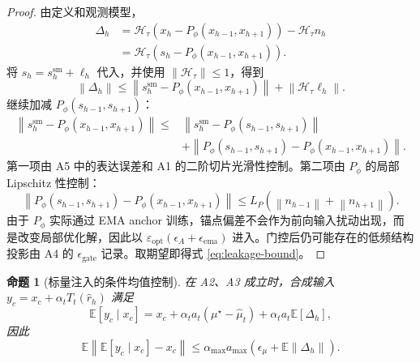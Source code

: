 \documentclass[11pt,a4paper,UTF8,fontset=fandol]{ctexart}
\newtheorem{proposition}[theorem]{命题}
\theoremstyle{definition}
\newcommand{\norm}[1]{\left\lVert#1\right\rVert}
\newcommand{\E}{\mathbb{E}}
\newcommand{\cH}{\mathcal{H}}
\begin{document}
\begin{proof}
由定义和观测模型，
\begin{equation}
\begin{aligned}
    \Delta_h
    &=\cH_\tau(x_h-P_\phi(x_{h-1},x_{h+1}))-\cH_\tau n_h\\
    &=\cH_\tau(s_h-P_\phi(x_{h-1},x_{h+1})).
\end{aligned}
\end{equation}
将 $s_h=s_h^{\mathrm{sm}}+\ell_h$ 代入，并使用 $\norm{\cH_\tau}\le1$，得到
\begin{equation}
    \norm{\Delta_h}
    \le
    \norm{s_h^{\mathrm{sm}}-P_\phi(x_{h-1},x_{h+1})}
    +\norm{\cH_\tau\ell_h}.
\end{equation}
继续加减 $P_\phi(s_{h-1},s_{h+1})$：
\begin{equation}
\begin{aligned}
    \norm{s_h^{\mathrm{sm}}-P_\phi(x_{h-1},x_{h+1})}
    \le&
    \norm{s_h^{\mathrm{sm}}-P_\phi(s_{h-1},s_{h+1})}\\
    &+\norm{P_\phi(s_{h-1},s_{h+1})
    -P_\phi(x_{h-1},x_{h+1})}.
\end{aligned}
\end{equation}
第一项由 A5 中的表达误差和 A1 的二阶切片光滑性控制。第二项由 $P_\phi$ 的局部 Lipschitz 性控制：
\begin{equation}
    \norm{P_\phi(s_{h-1},s_{h+1})
    -P_\phi(x_{h-1},x_{h+1})}
    \le L_P(\norm{n_{h-1}}+\norm{n_{h+1}}).
\end{equation}
由于 $P_\phi$ 实际通过 EMA anchor 训练，锚点偏差不会作为前向输入扰动出现，而是改变局部优化解，因此以 $\varepsilon_{\mathrm{opt}}(\epsilon_A+\epsilon_{\mathrm{ema}})$ 进入。门控后仍可能存在的低频结构投影由 A4 的 $\epsilon_{\mathrm{gate}}$ 记录。取期望即得式 \eqref{eq:leakage-bound}。
\end{proof}

\begin{proposition}[标量注入的条件均值控制]
\label{prop:conditional-mean}
在 A2、A3 成立时，合成输入 $y_c=x_c+\alpha_tT_t(\hat r_h)$ 满足
\begin{equation}
\label{eq:conditional-mean}
    \E[y_c\mid x_c]
    =
    x_c+\alpha_t a_t(\mu^\star-\hat\mu_t)
    +\alpha_t a_t\E[\Delta_h],
\end{equation}
因此
\begin{equation}
\label{eq:conditional-mean-bound}
    \E\norm{\E[y_c\mid x_c]-x_c}
    \le
    \alpha_{\max}a_{\max}
    \left(
    \epsilon_\mu+\E\norm{\Delta_h}
    \right).
\end{equation}
\end{proposition}
\end{document}
